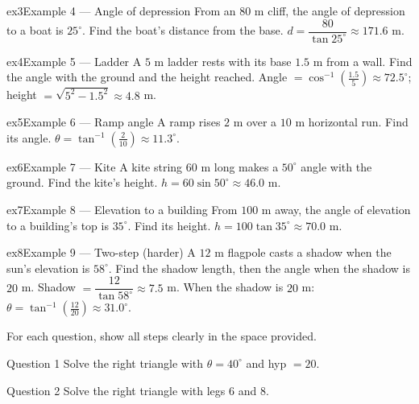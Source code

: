 \documentclass[11pt]{article}
\begin{document}
\begin{example}{ex3}{Example 4 --- Angle of depression}
From an $80$ m cliff, the angle of depression to a boat is $25^\circ$. Find the boat's distance from the base.
\soln $d=\dfrac{80}{\tan25^\circ}\approx171.6$ m.
\end{example}

\begin{example}{ex4}{Example 5 --- Ladder}
A $5$ m ladder rests with its base $1.5$ m from a wall. Find the angle with the ground and the height reached.
\soln Angle $=\cos^{-1}\!\left(\tfrac{1.5}{5}\right)\approx72.5^\circ$; height $=\sqrt{5^2-1.5^2}\approx4.8$ m.
\end{example}

\begin{example}{ex5}{Example 6 --- Ramp angle}
A ramp rises $2$ m over a $10$ m horizontal run. Find its angle.
\soln $\theta=\tan^{-1}\!\left(\tfrac{2}{10}\right)\approx11.3^\circ.$
\end{example}

\begin{example}{ex6}{Example 7 --- Kite}
A kite string $60$ m long makes a $50^\circ$ angle with the ground. Find the kite's height.
\soln $h=60\sin50^\circ\approx46.0$ m.
\end{example}

\begin{example}{ex7}{Example 8 --- Elevation to a building}
From $100$ m away, the angle of elevation to a building's top is $35^\circ$. Find its height.
\soln $h=100\tan35^\circ\approx70.0$ m.
\end{example}

\begin{example}{ex8}{Example 9 --- Two-step (harder)}
A $12$ m flagpole casts a shadow when the sun's elevation is $58^\circ$. Find the shadow length, then the angle when the shadow is $20$ m.
\soln Shadow $=\dfrac{12}{\tan58^\circ}\approx7.5$ m. When the shadow is $20$ m: $\theta=\tan^{-1}\!\left(\tfrac{12}{20}\right)\approx31.0^\circ.$
\end{example}

\clearpage
{}
For each question, show all steps clearly in the space provided.

\begin{qbox}{Question 1}
Solve the right triangle with $\theta=40^\circ$ and hyp $=20$.\workspace{2.6cm}
\end{qbox}

\begin{qbox}{Question 2}
Solve the right triangle with legs $6$ and $8$.\workspace{2.6cm}
\end{qbox}
\end{document}
